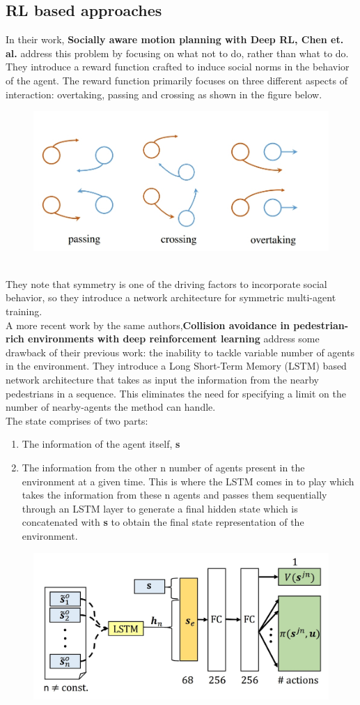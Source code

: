 \subsection*{RL based approaches}
 In their work, \textbf{Socially aware motion planning with Deep RL, Chen et. al.} address this problem by focusing on what not to do, rather than what to do. They introduce a reward function crafted to induce social norms in the behavior of the agent. The reward function primarily focuses on three different aspects of interaction: overtaking, passing and crossing as shown in the figure below.
 \begin{figure}[!htbp]
 	\centering
	\includegraphics[width=.6\linewidth]{figures/chapter2_rl_based_approach}
 \end{figure}
\\
They note that symmetry is one of the driving factors to incorporate social behavior, so they introduce a network architecture for symmetric multi-agent training.\\

A more recent work by the same authors,\textbf{Collision avoidance in pedestrian-rich environments with deep reinforcement learning}
address some drawback of their previous work: the inability to tackle variable number of agents in the environment. They introduce a Long Short-Term Memory (LSTM) based network architecture that takes as input the information from the nearby pedestrians in a sequence. This eliminates the need for specifying a limit on the number of nearby-agents the method can handle.\\
The state comprises of two parts: 
\begin{enumerate}
	\item The information of the agent itself, \textbf{s}
	\item The information from the other n number of agents present in the environment at a given time. This is where the LSTM comes in to play which takes the information from these n agents and passes them sequentially through an LSTM layer to generate a final hidden state which is concatenated with \textbf{s} to obtain the final state representation of the environment.
\end{enumerate}
\begin{figure}[!htbp]
	\centering
	\includegraphics[width=0.6\linewidth]{figures/everett}
\end{figure}

